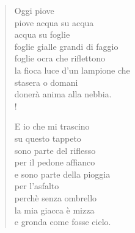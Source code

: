 
\begin{verse}
    Oggi piove\\
    piove acqua su acqua\\
    acqua su foglie\\
    foglie gialle grandi di faggio\\
    foglie ocra che riflettono\\
    la fioca luce d'un lampione che\\
    stasera o domani\\
    donerà anima alla nebbia.\\!

    E io che mi trascino\\
    su questo tappeto\\
    sono parte del riflesso\\
    per il pedone affianco\\
    e sono parte della pioggia\\
    per l'asfalto\\
    perchè senza ombrello\\
    la mia giacca è mizza\\
    e gronda come fosse cielo.
    
\end{verse}